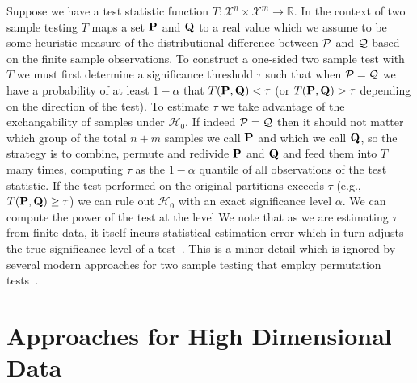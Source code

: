 Suppose we have a test statistic function $T: \mathcal{X}^n\times \mathcal{X}^m\to \mathbb{R}$.
In the context of two sample testing $T$ maps a set $\mathbf{P}$ and $\mathbf{Q}$ to a real value which we assume to be some heuristic measure
of the distributional difference between $\mathcal{P}$ and $\mathcal{Q}$ based on the finite sample observations.
To construct a one-sided two sample test with $T$ we must first determine a significance threshold $\tau$ such that when $\mathcal{P}=\mathcal{Q}$ we have a probability of at least $1-\alpha$
that $T(\mathbf{P}, \mathbf{Q}) < \tau$ (or $T(\mathbf{P}, \mathbf{Q}) > \tau$ depending on the direction of the test).
To estimate $\tau$ we take advantage of the exchangability of samples under $\mathcal{H}_0$.
If indeed $\mathcal{P}=\mathcal{Q}$ then it should not matter which group of the total $n+m$ samples we call $\mathbf{P}$ and which we call $\mathbf{Q}$, so the strategy is to
combine, permute and redivide $\mathbf{P}$ and $\mathbf{Q}$ and feed them into $T$ many times, computing $\tau$ as the $1-\alpha$ quantile of all observations of the test statistic.
If the test performed on the original partitions exceeds $\tau$ (e.g., $T(\mathbf{P}, \mathbf{Q}) \geq \tau$) we can rule out $\mathcal{H}_0$ with an exact significance level $\alpha$.
We can compute the power of the test at the level
We note that as we are estimating $\tau$ from finite data, it itself incurs statistical estimation error which in turn adjusts the true significance level of a test~\citep{NEURIPS2019_8fb21ee7}.
This is a minor detail which is ignored by several modern approaches for two sample testing that employ permutation tests~\citep{liu2020learning, zhao2022comparing}.


\section{Approaches for High Dimensional Data}\label{sec:cov-high-dimensions}
